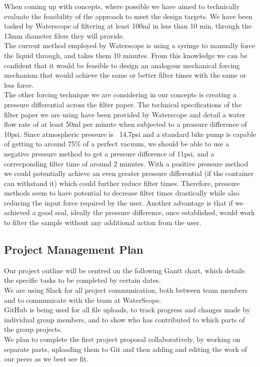 \documentclass[12pt]{article}
\begin{document}
When coming up with concepts, where possible we have aimed to technically evaluate the feasibility of the approach to meet the design targets. We have been tasked by Waterscope of filtering at least 100ml in less than 10 min, through the 13mm diameter filers they will provide. \\
The current method employed by Waterscope is using a syringe to manually force the liquid through, and takes them 10 minutes. From this knowledge we can be confident that it would be feasible to design an analogous mechanical forcing mechanism that would achieve the same or better filter times with the same or less force. \\
The other forcing technique we are considering in our concepts is creating a pressure differential across the filter paper. The technical specifications of the filter paper we are using have been provided by Waterscope and detail a water flow rate of at least 50ml per minute when subjected to a pressure difference of 10psi. Since atmospheric pressure is ~14.7psi and a standard bike pump is capable of getting to around 75\% of a perfect vacuum, we should be able to use a negative pressure method to get a pressure difference of 11psi, and a correcponding filter time of around 2 minutes. With a positive pressure method we could potentially achieve an even greater pressure differential (if the container can withstand it) which could further reduce filter times. Therefore, pressure methods seem to have potential to decrease filter times drastically while also reducing the input force required by the user. Another advantage is that if we achieved a good seal, ideally the pressure difference, once established, would work to filter the sample without any additional action from the user.  

\subsection{Project Management Plan}
Our project outline will be centred on the following Gantt chart, which details the specific tasks to be completed by certain dates.\\
We are using Slack for all project communication, both between team members and to communicate with the team at WaterScope.\\
GitHub is being used for all file uploads, to track progress and changes made by individual group members, and to show who has contributed to which parts of the group projects.\\
We plan to complete the first project proposal collaboratively, by working on separate parts, uploading them to Git and then adding and editing the work of our peers as we best see fit.
\end{document}
